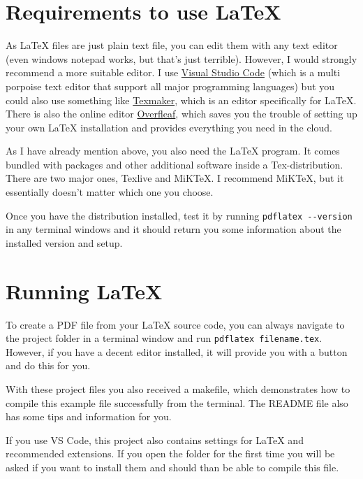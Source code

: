 \documentclass[
        faculty=1,
        paper=a4,
        fontsize=11pt,
        fontfamily=sans-serif,
        language=english,
        parskip=half+,
        linespacing=single,
        twoside=true,
        todos=off,
        draft=false,
    ]{HsH-report}
\begin{document}
    \section{Requirements to use LaTeX}
        As LaTeX files are just plain text file, you can edit them with any text editor (even windows notepad works, but that's just terrible).
        However, I would strongly recommend a more suitable editor. I use \href{https://code.visualstudio.com/}{Visual Studio Code} (which is a multi
        porpoise text editor that support all major programming languages) but you could also use something like
        \href{https://www.xm1math.net/texmaker/}{Texmaker}, which is an editor specifically for LaTeX. There is also the online editor
        \href{https://www.overleaf.com/}{Overfleaf}, which saves you the trouble of setting up your own LaTeX installation and provides everything you
        need in the cloud.

        \pagebreak\medskip
        As I have already mention above, you also need the LaTeX program. It comes bundled with packages and other additional software inside a
        Tex-distribution. There are two major ones, Texlive and MiKTeX. I recommend MiKTeX, but it essentially doesn't matter which one you choose.

        Once you have the distribution installed, test it by running \verb|pdflatex --version| in any terminal windows and it should return you
        some information about the installed version and setup.

    \section{Running LaTeX}
        To create a PDF file from your LaTeX source code, you can always navigate to the project folder in a terminal window and run
        \verb|pdflatex filename.tex|. However, if you have a decent editor installed, it will provide you with a button and do this for you.

        With these project files you also received a makefile, which demonstrates how to compile this example file successfully from the terminal. The
        README file also has some tips and information for you.

        If you use VS Code, this project also contains settings for LaTeX and recommended extensions. If you open the folder for the first time you
        will be asked if you want to install them and should than be able to compile this file.
\end{document}
